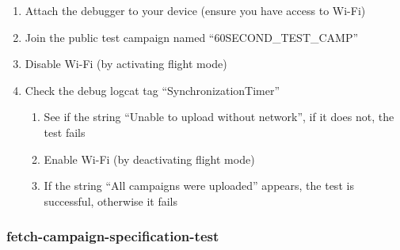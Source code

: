 \begin{enumerate}
    \item Attach the debugger to your device (ensure you have access to Wi-Fi)
    \item Join the public test campaign named ``60SECOND\_TEST\_CAMP''
    \item Disable Wi-Fi (by activating flight mode)
    \item Check the debug logcat tag ``SynchronizationTimer''
        \begin{enumerate}
            \item See if the string ``Unable to upload without network'', if it does not, the test fails
            \item Enable Wi-Fi (by deactivating flight mode)
            \item If the string ``All campaigns were uploaded'' appears, the test is successful, otherwise it fails
        \end{enumerate}
\end{enumerate}

\subsubsection{fetch-campaign-specification-test}

